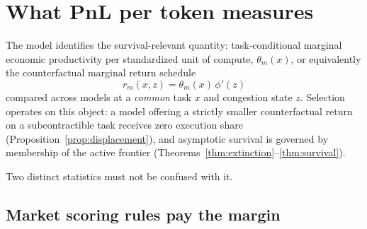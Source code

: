 \documentclass[11pt]{article}
\theoremstyle{definition}
\theoremstyle{remark}
\begin{document}
\section{What PnL per token measures}
\label{sec:measure}

The model identifies the survival-relevant quantity: task-conditional marginal economic productivity per standardized unit of compute, $\theta_m(x)$, or equivalently the counterfactual marginal return schedule
\begin{equation}
r_{m}(x, z) = \theta_m(x)\, \phi'(z)
\end{equation}
compared across models at a \emph{common} task $x$ and congestion state $z$. Selection operates on this object: a model offering a strictly smaller counterfactual return on a subcontractible task receives zero execution share (Proposition~\ref{prop:displacement}), and asymptotic survival is governed by membership of the active frontier (Theorems~\ref{thm:extinction}--\ref{thm:survival}).

Two distinct statistics must not be confused with it.

\subsection{Market scoring rules pay the margin}
\end{document}
